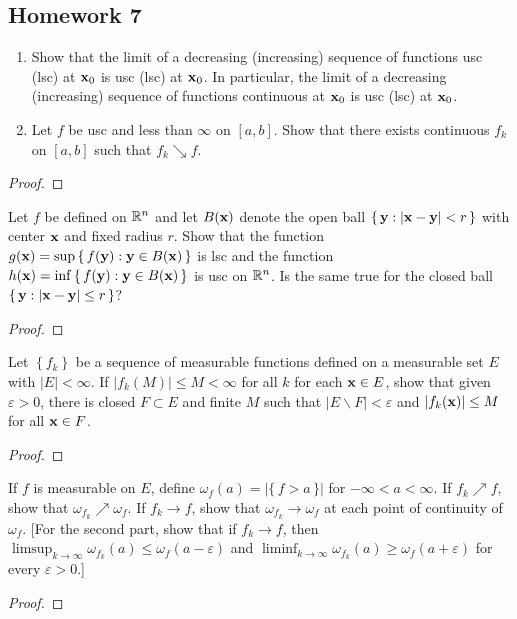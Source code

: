 \subsection{Homework 7}
\begin{problem}
\begin{enumerate}[label=(\alph*)]
\item Show that the limit of a decreasing (increasing) sequence of
  functions usc (lsc) at $\mathbf{x}_0$ is usc (lsc) at $\mathbf{x}_0$. In particular,
  the limit of a decreasing (increasing) sequence of functions continuous
  at $\mathbf{x}_0$ is usc (lsc) at $\mathbf{x}_0$.
\item Let $f$ be usc and less than $\infty$ on $[a,b]$. Show that there
  exists continuous $f_k$ on $[a,b]$ such that $f_k\searrow f$.
\end{enumerate}
\end{problem}
\begin{proof}
\end{proof}

\begin{problem}
Let $f$ be defined on $\mathbb{R}^n$ and let $B(\mathbf{x})$ denote the open ball
$\left\{\,\mathbf{y}:|\mathbf{x}-\mathbf{y}|<r\,\right\}$ with center
$\mathbf{x}$ and fixed radius $r$. Show that the function
$g(\mathbf{x})=\sup\left\{\,f(\mathbf{y}):\mathbf{y}\in B(\mathbf{x})\,\right\}$ is lsc
and the function $h(\mathbf{x})=\inf\left\{\,f(\mathbf{y}):\mathbf{y}\in
B(\mathbf{x})\,\right\}$ is usc on $\mathbb{R}^n$. Is the same true for the closed ball
$\left\{\,\mathbf{y}:|\mathbf{x}-\mathbf{y}|\leq r\,\right\}$?
\end{problem}
\begin{proof}
\end{proof}

\begin{problem}
Let $\left\{f_k\right\}$ be a sequence of measurable functions defined on a
measurable set $E$ with $|E|<\infty$. If $|f_k(M)|\leq M<\infty$ for all
$k$ for each $\mathbf{x}\in E$, show that given $\varepsilon>0$, there is closed
$F\subset E$ and finite $M$ such that $|E\smallsetminus F|<\varepsilon$ and
$|f_k(\mathbf{x})|\leq M$ for all $\mathbf{x}\in F$.
\end{problem}
\begin{proof}
\end{proof}

\begin{problem}
If $f$ is measurable on $E$, define
$\omega_f(a)=|\{\,f>a\,\}|$ for
$-\infty<a<\infty$. If $f_k\nearrow f$, show that
$\omega_{f_k}\nearrow\omega_f$. If $f_k\to f$, show that
$\omega_{f_k}\to\omega_f$ at each point of continuity of $\omega_f$. [For
the second part, show that if $f_k\to f$, then
$\limsup_{k\to\infty}\omega_{f_k}(a)\leq\omega_f(a-\varepsilon)$ and
$\liminf_{k\to\infty}\omega_{f_k}(a)\geq\omega_f(a+\varepsilon)$ for every
$\varepsilon>0$.]
\end{problem}
\begin{proof}
\end{proof}

